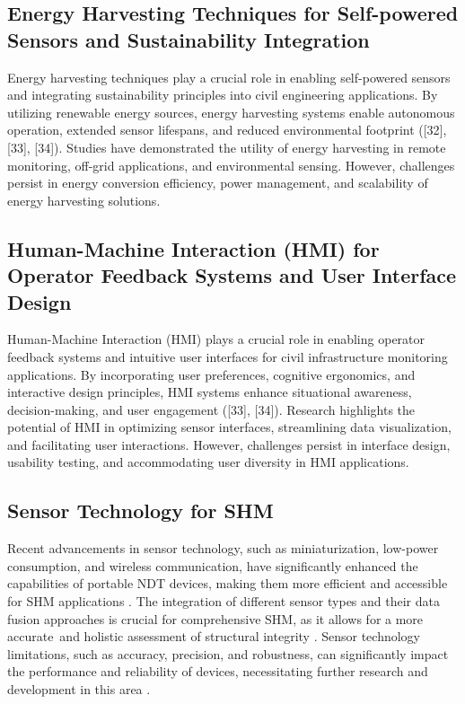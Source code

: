 \documentclass[journal, a4paper]{IEEEtran}
\begin{document}
\subsection{Energy Harvesting Techniques for Self-powered Sensors and Sustainability Integration}
Energy harvesting techniques play a crucial role in enabling self-powered sensors and integrating sustainability
principles into civil engineering applications. By utilizing renewable energy sources, energy harvesting systems
enable autonomous operation, extended sensor lifespans, and reduced environmental footprint ([32], [33], [34]).
Studies have demonstrated the utility of energy harvesting in remote monitoring, off-grid applications,
and environmental sensing. However, challenges persist in energy conversion efficiency, power management,
and scalability of energy harvesting solutions.

\subsection{Human-Machine Interaction (HMI) for Operator Feedback Systems and User Interface Design}
Human-Machine Interaction (HMI) plays a crucial role in enabling operator feedback systems and intuitive
user interfaces for civil infrastructure monitoring applications. By incorporating user preferences, cognitive
ergonomics, and interactive design principles, HMI systems enhance situational awareness, decision-making,
and user engagement ([33], [34]). Research highlights the potential of HMI in optimizing sensor interfaces,
streamlining data visualization, and facilitating user interactions. However, challenges persist in interface
design, usability testing, and accommodating user diversity in HMI applications.








\subsection{Sensor Technology for SHM}
Recent advancements in sensor technology, such as miniaturization, low-power consumption, and wireless communication,
have significantly enhanced the capabilities of portable NDT devices,
making them more efficient and accessible for SHM applications \cite{hassani_systematic_2023} \cite{valeske_next_2020}.
The integration of different sensor types and their data fusion approaches is crucial
for comprehensive SHM, as it allows for a more accurate\
and holistic assessment of structural integrity \cite{broer_need_2022} \cite{azimi_data-driven_2020}.
Sensor technology limitations, such as accuracy, precision, and robustness,
can significantly impact the performance and reliability of devices,
necessitating further research and development in this area \cite{varshney_challenges_2021} \cite{moore_iot_2020}.
\end{document}
